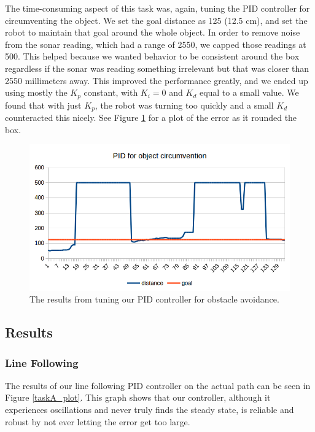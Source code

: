 \documentclass[12pt]{article}
\begin{document}
The time-consuming aspect of this task was, again, tuning the PID controller for circumventing the object. We set the goal distance as 125 (12.5 cm), and set the robot to maintain that goal around the whole object. In order to remove noise from the sonar reading, which had a range of 2550, we capped those readings at 500. This helped because we wanted behavior to be consistent around the box regardless if the sonar was reading something irrelevant but that was closer than 2550 millimeters away. This improved the performance greatly, and we ended up using mostly the $K_p$ constant, with $K_i=0$ and $K_d$ equal to a small value. We found that with just $K_p$, the robot was turning too quickly and a small $K_d$ counteracted this nicely. See Figure \ref{fig:pid_object} for a plot of the error as it rounded the box.

\begin{figure}
	\includegraphics[width=\linewidth]{pid_object_outs}
	\caption{The results from tuning our PID controller for obstacle avoidance.}
	\label{fig:pid_object}
\end{figure}

\subsection{Results}

\subsubsection{Line Following}

The results of our line following PID controller on the actual path can be seen in Figure \ref{taskA_plot}. This graph shows that our controller, although it experiences oscillations and never truly finds the steady state, is reliable and robust by not ever letting the error get too large.
\end{document}
